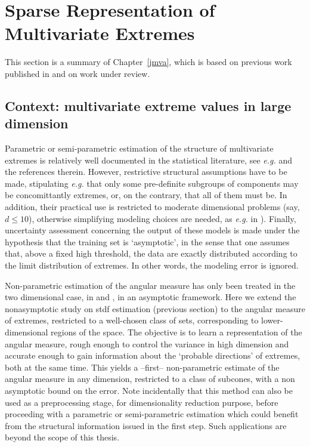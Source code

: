 \section{Sparse Representation of Multivariate Extremes}
\label{resume:sec:JMVA}
This section is a summary of Chapter~\ref{jmva}, which is based on previous work published in \cite{AISTAT15} and on work \cite{ARXIV16} under review.
\subsection{Context: multivariate extreme values in large dimension}
\label{context}

Parametric or semi-parametric estimation of the structure of multivariate extremes is relatively well documented in the statistical literature, see  \emph{e.g.} \cite{coles1991modeling,fougeres2009models,cooley2010pairwise,sabourinNaveau2012} and the references therein. However, restrictive structural assumptions have to be made, stipulating \emph{e.g.} that only some pre-definite subgroups of components may be concomittantly extremes, or, on the contrary, that all of them must be. In addition, their practical use is restricted to moderate dimensional problems (say, $d\le 10$), otherwise simplifying modeling choices are needed, as \emph{e.g.} in \cite{stephenson2009high}). Finally, uncertainty assessment concerning the output of these models is made under the hypothesis that the training set is `asymptotic', in the sense that one assumes that, above a fixed high threshold, the data are exactly distributed according to the limit distribution of extremes. In other words, the modeling error is ignored. 

Non-parametric estimation of the angular measure has only been treated in the two dimensional case, in \cite{Einmahl2001} and \cite{Einmahl2009}, in an asymptotic framework. Here we extend the nonasymptotic study on {\sc stdf} estimation (previous section) to the angular measure of extremes, restricted to a well-chosen class of sets, corresponding to lower-dimensional regions of the space. The objective is to learn a representation of the angular measure, rough enough to control the variance in high dimension and accurate enough to gain information about the `probable directions' of extremes, both at the same time. This yields a --first-- non-parametric estimate of the angular measure in any dimension, restricted to a class of subcones, %
with a non asymptotic bound on the error. 
Note incidentally that this method can also be used as a preprocessing stage, for dimensionality reduction purpose, before proceeding with a parametric or semi-parametric estimation which could benefit from the structural information issued in the first step. Such applications are beyond the scope of this thesis.


